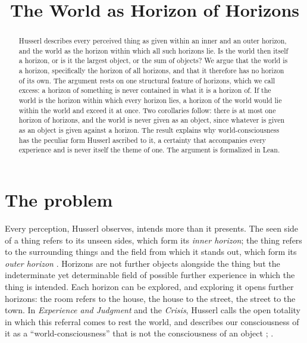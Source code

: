 \documentclass{situationist-preprint}
\title{The World as Horizon of Horizons}
\begin{document}
\maketitle

\begin{abstract}
Husserl describes every perceived thing as given within an inner and an outer horizon, and the world as the horizon within which all such horizons lie. Is the world then itself a horizon, or is it the largest object, or the sum of objects? We argue that the world is a horizon, specifically the horizon of all horizons, and that it therefore has no horizon of its own. The argument rests on one structural feature of horizons, which we call excess: a horizon of something is never contained in what it is a horizon of. If the world is the horizon within which every horizon lies, a horizon of the world would lie within the world and exceed it at once. Two corollaries follow: there is at most one horizon of horizons, and the world is never given as an object, since whatever is given as an object is given against a horizon. The result explains why world-consciousness has the peculiar form Husserl ascribed to it, a certainty that accompanies every experience and is never itself the theme of one. The argument is formalized in Lean.
\end{abstract}

\section{The problem}

Every perception, Husserl observes, intends more than it presents. The seen side of a thing refers to its unseen sides, which form its \emph{inner horizon}; the thing refers to the surrounding things and the field from which it stands out, which form its \emph{outer horizon} \citep[§§27, 44]{Husserl1913}. Horizons are not further objects alongside the thing but the indeterminate yet determinable field of possible further experience in which the thing is intended. Each horizon can be explored, and exploring it opens further horizons: the room refers to the house, the house to the street, the street to the town. In \emph{Experience and Judgment} and the \emph{Crisis}, Husserl calls the open totality in which this referral comes to rest the world, and describes our consciousness of it as a \enquote{world-consciousness} that is not the consciousness of an object \citep[§§7--8]{Husserl1939}; \citep[§37]{Husserl1954}.
\end{document}
